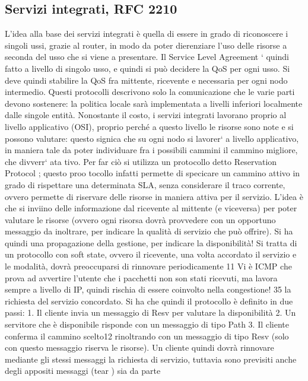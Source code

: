 \subsection{Servizi integrati, RFC 2210}
L'idea alla base dei servizi integrati è quella di essere in grado di riconoscere i
singoli ussi, grazie al router, in modo da poter dierenziare l'uso delle risorse
a seconda del usso che si viene a presentare. Il Service Level Agreement `
quindi fatto a livello di singolo usso, e quindi si può decidere la QoS per ogni
usso. Si deve quindi stabilire la QoS fra mittente, ricevente e necessaria per
ogni nodo intermedio. Questi protocolli descrivono solo la comunicazione che
le varie parti devono sostenere: la politica locale sarà implementata a livelli
inferiori localmente dalle singole entità.
Nonostante il costo, i servizi integrati lavorano proprio al livello applicativo
(OSI), proprio perché a questo livello le risorse sono note e si possono valutare:
questo signica che su ogni nodo si lavorer` a livello applicativo, in maniera tale
da poter individuare fra i possibili cammini il cammino migliore, che divverr` ata
tivo. Per far ciò si utilizza un protocollo detto Reservation Protocol ; questo proo
tocollo infatti permette di specicare un cammino attivo in grado di rispettare
una determinata SLA, senza considerare il traco corrente, ovvero permette di
riservare delle risorse in maniera attiva per il servizio. L'idea è che si inviino
delle informazione dal ricevente al mittente (e viceversa) per poter valutare le
risorse (ovvero ogni risorsa dovrà provvedere con un opportuno messaggio da
inoltrare, per indicare la qualità di servizio che può offrire). Si ha quindi una
propagazione della gestione, per indicare la disponibilità!
Si tratta di un protocollo con soft state, ovvero il ricevente, una volta accordato il servizio e le modalità, dovrà
preoccuparsi di rinnovare periodicamente
11 Vi è ICMP che prova ad avvertire l'utente che i pacchetti non son stati ricevuti, ma lavora
sempre a livello di IP, quindi rischia di essere coinvolto nella congestione!
35
la richiesta del servizio concordato. Si ha che quindi il protocollo è definito in
due passi:
1. Il cliente invia un messaggio di Resv per valutare la disponibilità
2. Un servitore che è disponibile risponde con un messaggio di tipo Path
3. Il cliente conferma il cammino scelto12 rinoltrando con un messaggio di
tipo Resv (solo con questo messaggio riserva le risorse).
Un cliente quindi dovrà rinnovare mediante gli stessi messaggi la richiesta di
servizio, tuttavia sono previsiti anche degli appositi messaggi (tear ) sia da parte
